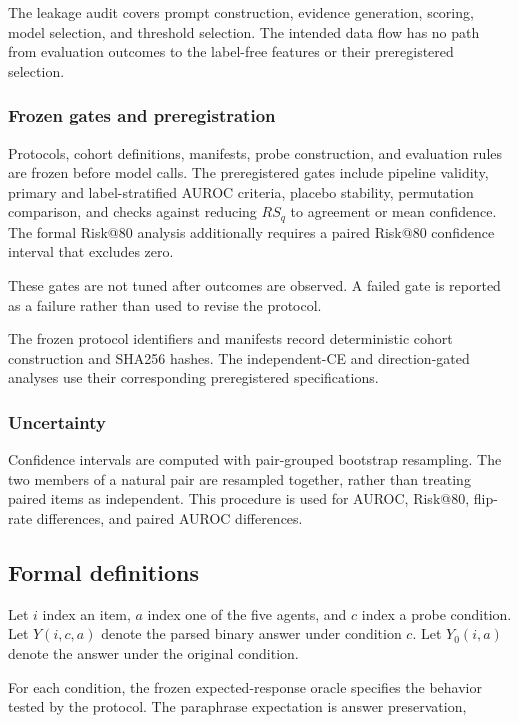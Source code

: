 \documentclass[11pt]{article}
\begin{document}
The leakage audit covers prompt construction, evidence generation, scoring, model selection, and threshold selection. The intended data flow has no path from evaluation outcomes to the label-free features or their preregistered selection.

\subsubsection{Frozen gates and preregistration}

Protocols, cohort definitions, manifests, probe construction, and evaluation rules are frozen before model calls. The preregistered gates include pipeline validity, primary and label-stratified AUROC criteria, placebo stability, permutation comparison, and checks against reducing \(RS_q\) to agreement or mean confidence. The formal Risk@80 analysis additionally requires a paired Risk@80 confidence interval that excludes zero.

These gates are not tuned after outcomes are observed. A failed gate is reported as a failure rather than used to revise the protocol.

The frozen protocol identifiers and manifests record deterministic cohort construction and SHA256 hashes. The independent-CE and direction-gated analyses use their corresponding preregistered specifications.

\subsubsection{Uncertainty}

Confidence intervals are computed with pair-grouped bootstrap resampling. The two members of a natural pair are resampled together, rather than treating paired items as independent. This procedure is used for AUROC, Risk@80, flip-rate differences, and paired AUROC differences.

\subsection{Formal definitions}

Let \(i\) index an item, \(a\) index one of the five agents, and \(c\) index a probe condition. Let \(Y(i,c,a)\) denote the parsed binary answer under condition \(c\). Let \(Y_0(i,a)\) denote the answer under the original condition.

For each condition, the frozen expected-response oracle specifies the behavior tested by the protocol. The paraphrase expectation is answer preservation,
\end{document}
